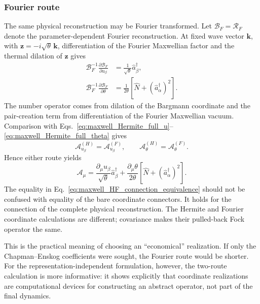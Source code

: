 \documentclass[11pt,oneside]{article}
\numberwithin{equation}{section}
\theoremstyle{definition}
\begin{document}
\subsubsection{Fourier route}
\label{subsubsec:maxwell_Fourier_connection_route}

The same physical reconstruction may be Fourier transformed.  Let $\mathcal B_F=\mathcal R_F$ denote the parameter-dependent Fourier reconstruction.  At fixed wave vector $\bm k$, with $\bm z=-i\sqrt\theta\,\bm k$, differentiation of the Fourier Maxwellian factor and the thermal dilation of $\bm z$ gives
\begin{align}
\mathcal B_F^{-1}\frac{\partial\mathcal B_F}{\partial u_\beta}
&=\frac{1}{\sqrt\theta}\hat a_\beta^\dagger,
\label{eq:maxwell_full_connection_u}
\\
\mathcal B_F^{-1}\frac{\partial\mathcal B_F}{\partial\theta}
&=\frac{1}{2\theta}
\left[\hat N+(\hat a_\alpha^\dagger)^2\right].
\label{eq:maxwell_full_connection_theta}
\end{align}
The number operator comes from dilation of the Bargmann coordinate and the pair-creation term from differentiation of the Fourier Maxwellian vacuum.  Comparison with Eqs.~\eqref{eq:maxwell_Hermite_full_u}--\eqref{eq:maxwell_Hermite_full_theta} gives
\begin{equation}
\boxed{
\mathcal A^{(H)}_{u_\beta}=\mathcal A^{(F)}_{u_\beta},
\qquad
\mathcal A^{(H)}_\theta=\mathcal A^{(F)}_\theta.
}
\label{eq:maxwell_HF_connection_equivalence}
\end{equation}
Hence either route yields
\begin{equation}
\boxed{
\mathcal A_\mu
=
\frac{\partial_\mu u_\beta}{\sqrt\theta}\hat a_\beta^\dagger
+
\frac{\partial_\mu\theta}{2\theta}
\left[\hat N+(\hat a_\alpha^\dagger)^2\right].
}
\label{eq:maxwell_A_mu}
\end{equation}
The equality in Eq.~\eqref{eq:maxwell_HF_connection_equivalence} should not be confused with equality of the bare coordinate connectors.  It holds for the connection of the complete physical reconstruction.  The Hermite and Fourier coordinate calculations are different; covariance makes their pulled-back Fock operator the same.

This is the practical meaning of choosing an ``economical'' realization.  If only the Chapman--Enskog coefficients were sought, the Fourier route would be shorter.  For the representation-independent formulation, however, the two-route calculation is more informative: it shows explicitly that coordinate realizations are computational devices for constructing an abstract operator, not part of the final dynamics.
\end{document}
